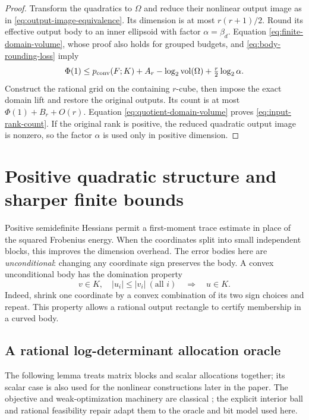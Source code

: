 \begin{proof}
Transform the quadratics to $\Omega$ and reduce their nonlinear output
image as in \eqref{eq:output-image-equivalence}. Its dimension is at
most $r(r+1)/2$. Round its effective output body to an inner ellipsoid
with factor $\alpha=\beta_d$. Equation \eqref{eq:finite-domain-volume},
whose proof also holds for grouped budgets, and
\eqref{eq:body-rounding-loss} imply
\[
 \Phi(1)\le p_{\mathrm{conv}}(F;K)+A_r-\log_2\operatorname{vol}(\Omega)
                           +\tfrac r2\log_2\alpha.
\]
Construct the rational grid on the containing $r$-cube, then impose the
exact domain lift and restore the original outputs. Its count is at
most $\Phi(1)+B_r+O(r)$. Equation \eqref{eq:quotient-domain-volume}
proves \eqref{eq:input-rank-count}. If the original rank is positive,
the reduced quadratic output image is nonzero, so the factor $\alpha$
is used only in positive dimension.
\end{proof}

\section{Positive quadratic structure and sharper finite bounds}\label{sec:psd-structure}

Positive semidefinite Hessians permit a first-moment trace estimate in
place of the squared Frobenius energy. When the coordinates split into
small independent blocks, this improves the dimension overhead. The
error bodies here are \emph{unconditional}: changing any coordinate sign
preserves the body. A convex unconditional body has the domination
property
\begin{equation}\label{eq:unconditional-domination}
 v\in K,\quad |u_i|\le|v_i|\ (\text{all }i)\quad\Longrightarrow\quad u\in K.
\end{equation}
Indeed, shrink one coordinate by a convex combination of its two sign
choices and repeat. This property allows a rational output rectangle to
certify membership in a curved body.

\subsection{A rational log-determinant allocation oracle}

The following lemma treats matrix blocks and scalar allocations
together; its scalar case is also used for the nonlinear constructions
later in the paper. The objective and
weak-optimization machinery are classical
\citep{vandenberghe1998,gls1981}; the explicit interior ball and
rational feasibility repair adapt them to the oracle and bit model used
here.

